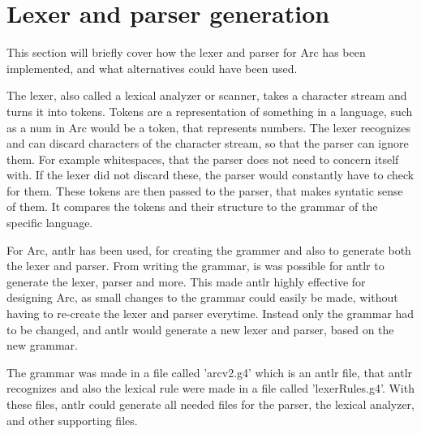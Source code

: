 \section{Lexer and parser generation}

This section will briefly cover how the lexer and parser for Arc has been implemented, and what alternatives could have been used.

The lexer, also called a lexical analyzer or scanner, takes a character stream and turns it into tokens. Tokens are a representation of something in a language, such as a num in Arc would be a token, that represents numbers. The lexer recognizes and can discard characters of the character stream, so that the parser can ignore them. For example whitespaces, that the parser does not need to concern itself with. If the lexer did not discard these, the parser would constantly have to check for them. These tokens are then passed to the parser, that makes syntatic sense of them. It compares the tokens and their structure to the grammar of the specific language.\cite{Parr2014}

For Arc, \gls{antlr} has been used, for creating the grammer and also to generate both the lexer and parser. From writing the grammar, is was possible for \gls{antlr} to generate the lexer, parser and more.\cite{Parr2014} This made \gls{antlr} highly effective for designing Arc, as small changes to the grammar could easily be made, without having to re-create the lexer and parser everytime. Instead only the grammar had to be changed, and \gls{antlr} would generate a new lexer and parser, based on the new grammar.

The grammar was made in a file called 'arcv2.g4' which is an \gls{antlr} file, that \gls{antlr} recognizes and also the lexical rule were made in a file called 'lexerRules.g4'. With these files, \gls{antlr} could generate all needed files for the parser, the lexical analyzer, and other supporting files.


